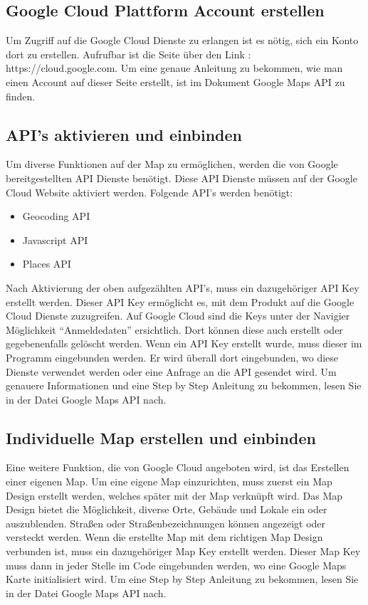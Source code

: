 \subsection{Google Cloud Plattform Account erstellen}
Um Zugriff auf die Google Cloud Dienste zu erlangen ist es nötig, sich ein Konto dort zu erstellen. Aufrufbar ist die Seite über den Link : https://cloud.google.com.  Um eine genaue Anleitung zu bekommen, wie man einen Account auf dieser Seite erstellt, ist im Dokument Google Maps API zu finden.

\subsection{API's aktivieren und einbinden}
Um diverse Funktionen auf der Map zu ermöglichen, werden die von Google bereitgestellten API Dienste benötigt.  Diese API Dienste müssen auf der Google Cloud Website aktiviert werden. Folgende API's werden benötigt:
\begin{itemize}
	\item Geocoding API 
	\item Javascript API
	\item Places API  
\end{itemize}
Nach Aktivierung der oben aufgezählten API's, muss ein dazugehöriger API Key erstellt werden. Dieser API Key ermöglicht es, mit dem Produkt auf die Google Cloud Dienste zuzugreifen. Auf Google Cloud sind die Keys unter der Navigier Möglichkeit  “Anmeldedaten” ersichtlich. Dort können diese auch  erstellt oder gegebenenfalls gelöscht werden. Wenn ein API Key erstellt wurde, muss dieser im Programm eingebunden werden. Er wird überall dort eingebunden, wo diese Dienste verwendet werden oder eine Anfrage an die API gesendet wird. Um genauere Informationen und eine Step by Step Anleitung zu bekommen, lesen Sie in der Datei Google Maps API nach.

\newpage
\subsection{Individuelle Map erstellen und einbinden}
Eine weitere Funktion, die von Google Cloud angeboten wird, ist das Erstellen einer eigenen Map. 
Um eine eigene Map einzurichten, muss zuerst ein Map Design erstellt werden, welches später mit der Map verknüpft wird. Das Map Design bietet die Möglichkeit, diverse Orte, Gebäude und Lokale  ein oder auszublenden. Straßen oder Straßenbezeichnungen können angezeigt oder versteckt werden. Wenn die erstellte Map mit dem richtigen Map Design verbunden ist, muss ein dazugehöriger Map Key erstellt werden. Dieser Map Key muss dann in jeder Stelle im Code eingebunden werden, wo eine Google Maps Karte initialisiert wird. Um eine Step by Step Anleitung zu bekommen, lesen Sie in der Datei Google Maps API nach.



